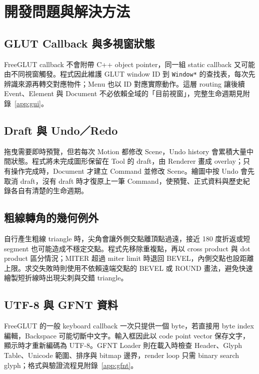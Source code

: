 \section{開發問題與解決方法}

\subsection{GLUT Callback 與多視窗狀態}

FreeGLUT callback 不會附帶 C++ object pointer，同一組 static callback 又可能由不同視窗觸發。程式因此維護 GLUT window ID 到 \lstinline|Window*| 的查找表，每次先辨識來源再轉交對應物件；Menu 也以 ID 對應實際動作。這層 routing 讓後續 Event、Element 與 Document 不必依賴全域的「目前視窗」，完整生命週期見附錄~\ref{app:gui}。

\subsection{Draft 與 Undo／Redo}

拖曳需要即時預覽，但若每次 Motion 都修改 Scene，Undo history 會累積大量中間狀態。程式將未完成圖形保留在 Tool 的 draft，由 Renderer 畫成 overlay；只有操作完成時，Document 才建立 Command 並修改 Scene。繪圖中按 Undo 會先取消 draft，沒有 draft 時才復原上一筆 Command，使預覽、正式資料與歷史紀錄各自有清楚的生命週期。

\subsection{粗線轉角的幾何例外}

自行產生粗線 triangle 時，尖角會讓外側交點離頂點過遠，接近 180 度折返或短 segment 也可能造成不穩定交點。程式先移除重複點，再以 cross product 與 dot product 區分情況；MITER 超過 miter limit 時退回 BEVEL，內側交點也設距離上限。求交失敗時則使用不依賴遠端交點的 BEVEL 或 ROUND 畫法，避免快速繪製短折線時出現尖刺與交錯 triangle。

\subsection{UTF-8 與 GFNT 資料}

FreeGLUT 的一般 keyboard callback 一次只提供一個 byte，若直接用 byte index 編輯，Backspace 可能切斷中文字。輸入框因此以 code point vector 保存文字，顯示時才重新編碼為 UTF-8。GFNT Loader 則在載入時檢查 Header、Glyph Table、Unicode 範圍、排序與 bitmap 邊界，render loop 只需 binary search glyph；格式與驗證流程見附錄~\ref{app:gfnt}。
